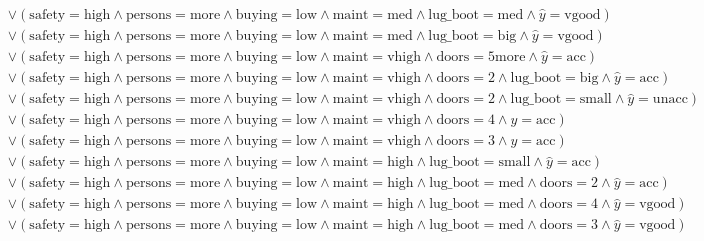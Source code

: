 \begin{scriptsize}
\[\begin{aligned}
  \\ & \lor (\text{safety}=\text{high} \land \text{persons}=\text{more} \land \text{buying}=\text{low} \land \text{maint}=\text{med} \land \text{lug_boot}=\text{med} \land \hat{y}=\text{vgood})
  \\ & \lor (\text{safety}=\text{high} \land \text{persons}=\text{more} \land \text{buying}=\text{low} \land \text{maint}=\text{med} \land \text{lug_boot}=\text{big} \land \hat{y}=\text{vgood})
  \\ & \lor (\text{safety}=\text{high} \land \text{persons}=\text{more} \land \text{buying}=\text{low} \land \text{maint}=\text{vhigh} \land \text{doors}=\text{5more} \land \hat{y}=\text{acc})
  \\ & \lor (\text{safety}=\text{high} \land \text{persons}=\text{more} \land \text{buying}=\text{low} \land \text{maint}=\text{vhigh} \land \text{doors}=\text{2} \land \text{lug_boot}=\text{big} \land \hat{y}=\text{acc})
  \\ & \lor (\text{safety}=\text{high} \land \text{persons}=\text{more} \land \text{buying}=\text{low} \land \text{maint}=\text{vhigh} \land \text{doors}=\text{2} \land \text{lug_boot}=\text{small} \land \hat{y}=\text{unacc})
  \\ & \lor (\text{safety}=\text{high} \land \text{persons}=\text{more} \land \text{buying}=\text{low} \land \text{maint}=\text{vhigh} \land \text{doors}=\text{4} \land \hat{y}=\text{acc})
  \\ & \lor (\text{safety}=\text{high} \land \text{persons}=\text{more} \land \text{buying}=\text{low} \land \text{maint}=\text{vhigh} \land \text{doors}=\text{3} \land \hat{y}=\text{acc})
  \\ & \lor (\text{safety}=\text{high} \land \text{persons}=\text{more} \land \text{buying}=\text{low} \land \text{maint}=\text{high} \land \text{lug_boot}=\text{small} \land \hat{y}=\text{acc})
  \\ & \lor (\text{safety}=\text{high} \land \text{persons}=\text{more} \land \text{buying}=\text{low} \land \text{maint}=\text{high} \land \text{lug_boot}=\text{med} \land \text{doors}=\text{2} \land \hat{y}=\text{acc})
  \\ & \lor (\text{safety}=\text{high} \land \text{persons}=\text{more} \land \text{buying}=\text{low} \land \text{maint}=\text{high} \land \text{lug_boot}=\text{med} \land \text{doors}=\text{4} \land \hat{y}=\text{vgood})
  \\ & \lor (\text{safety}=\text{high} \land \text{persons}=\text{more} \land \text{buying}=\text{low} \land \text{maint}=\text{high} \land \text{lug_boot}=\text{med} \land \text{doors}=\text{3} \land \hat{y}=\text{vgood})

\end{aligned}\]
\end{scriptsize}
